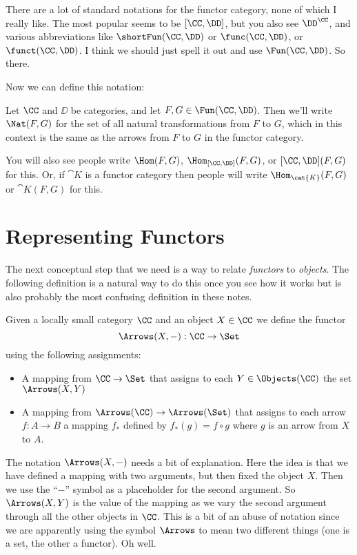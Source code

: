 There are a lot of standard notations for the functor category, none of which I really
like. The most popular seems to be $[\CC, \DD]$, but you also see $\DD^{\CC}$, and various
abbreviations like $\shortFun(\CC,\DD)$ or $\func(\CC,\DD)$,
or $\funct(\CC,\DD)$. I think we should just spell it out and use
$\Fun(\CC,\DD)$. So there.

Now we can define this notation:

\begin{defn}
Let $\CC$ and $\DD$ be categories, and let $F, G \in \Fun(\CC, \DD)$. Then we'll write
$\Nat(F, G)$ for the set of all natural transformations from $F$ to $G$, which in this
context is the same as the arrows from $F$ to $G$ in the functor category.
\end{defn}
\noindent
You will also see people write $\Hom(F, G)$, $\Hom_{[\CC,\DD]}(F,G)$, or 
$[\CC,\DD](F,G)$ for this. Or, if $\cat{K}$ is a functor category then 
people will write $\Hom_{\cat{K}}(F,G)$ or
$\cat{K}(F,G)$ for this.

\section{Representing Functors}

The next conceptual step that we need is a way to relate {\it functors} to {\it objects}.
The following definition is a natural way to do this once you see how it works but is also
probably the most confusing definition in these notes.

\begin{defn}
Given a locally small category $\CC$ and an object $X \in \CC$ we define the functor
$$
\Arrows(X,-) : \CC \to \Set
$$
using the following assignments:
\begin{itemize}
\item A mapping from $\CC \to \Set$ that assigns to each $Y \in \Objects(\CC)$ the set
$\Arrows(X,Y)$
\item A mapping from $\Arrows(\CC) \to \Arrows(\Set) $ that assigns to each arrow $f: A
\to B$ a mapping $f_*$ defined by $f_*(g) = f\circ g$ where $g$ is an arrow from $X$ to $A$.
\end{itemize}
\end{defn}
\noindent
The notation $\Arrows(X,-)$ needs a bit of explanation. Here the idea is that we have
defined a mapping with two arguments, but then fixed the object $X$. Then we use the
``$-$'' symbol as a placeholder for the second argument. So $\Arrows(X,Y)$ is the value of
the mapping as we vary the second argument through all the other objects in $\CC$. This is
a bit of an abuse of notation since we are apparently using the symbol $\Arrows$ to mean
two different things (one is a set, the other a functor). Oh well.

